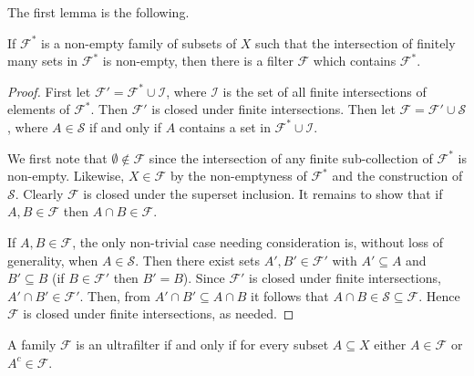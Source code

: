 The first lemma is the following.
\begin{lemma}
\label{filter:1}
If \( \mathcal{F} ^{\ast}  \) is a non-empty family of subsets of \( X \) such that the intersection of finitely many sets in \( \mathcal{F} ^{\ast}  \) is non-empty, then there is a filter \( \mathcal{F}  \) which contains \( \mathcal{F} ^{\ast}  \).
\end{lemma}
\begin{proof}
First let \( \mathcal{F}' = \mathcal{F}^{\ast} \cup \mathcal{I} \), where \( \mathcal{I} \) is the set of all finite intersections of elements of \( \mathcal{F}^{\ast}   \). Then \( \mathcal{F'}  \) is closed under finite intersections. Then let \( \mathcal{F} = \mathcal{F}' \cup \mathcal{S}  \), where \( A \in \mathcal{S}  \) if and only if \( A \) contains a set in \( \mathcal{F}^{\ast} \cup \mathcal{I}  \).

We first note that \( \emptyset \notin \mathcal{F} \) since the intersection of any finite sub-collection of \( \mathcal{F} ^{\ast}  \) is non-empty. Likewise, \( X \in \mathcal{F}  \) by the non-emptyness of \( \mathcal{F} ^{\ast}  \) and the construction of \( \mathcal{S}  \). Clearly \( \mathcal{F}  \) is closed under the superset inclusion. It remains to show that if \( A, B \in \mathcal{F}  \) then \( A \cap B \in \mathcal{F}  \). 

If \( A, B \in \mathcal{F}  \), the only non-trivial case needing consideration is, without loss of generality, when \( A \in \mathcal{S}  \). Then there exist sets \( A', B' \in \mathcal{F}' \) with \( A' \subseteq A \) and \( B' \subseteq B \) (if \( B \in \mathcal{F}' \) then \( B' = B \)). Since \( \mathcal{F} ' \) is closed under finite intersections, \( A' \cap B' \in \mathcal{F} ' \). Then, from \( A' \cap B' \subseteq A \cap B \) it follows that \( A \cap B \in \mathcal{S} \subseteq \mathcal{F}  \). Hence \( \mathcal{F}  \) is closed under finite intersections, as needed.
\end{proof}
\begin{lemma}
\label{filter:2}
A family \( \mathcal{F}  \) is an ultrafilter if and only if for every subset \( A \subseteq X \) either \( A \in \mathcal{F}  \) or \( A^{c} \in \mathcal{F}  \).
\end{lemma}
